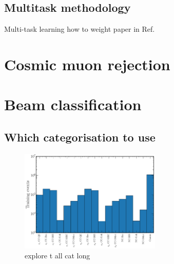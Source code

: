 \subsection{Multitask methodology} %
\label{sec:cvn_baseline_multi} %

Multi-task learning how to weight paper in Ref.~\cite{kendall2018}

\section{Cosmic muon rejection} %
\label{sec:cvn_cosmic} %

\section{Beam classification} %
\label{sec:cvn_beam} %

\subsection{Which categorisation to use} %
\label{sec:cvn_beam_cat} %

\begin{figure} %
    \includegraphics[width=0.6\textwidth]{diagrams/7-cvn/chipsnet/explore_t_all_cat.pdf}
    \caption[explore t all cat short]
    {explore t all cat long}
    \label{fig:explore_t_all_cat}
\end{figure}

